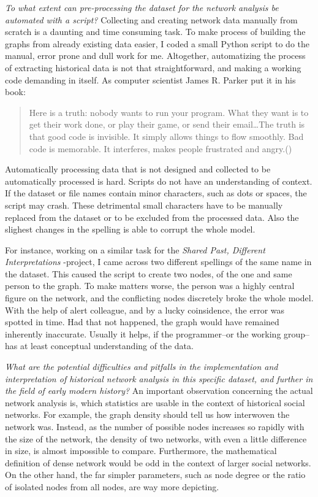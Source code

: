 \textit{To what extent can pre-processing the dataset for the network analysis be automated with a script?} Collecting and creating network data manually from scratch is a daunting and time consuming task. To make process of building the graphs from already existing data easier, I coded a small Python script to do the manual, error prone and dull work for me. Altogether, automatizing the process of extracting historical data is not that straightforward, and making a working code demanding in itself. As computer scientist James R. Parker put it in his book: 

\begin{quote}
	Here is a truth: nobody wants to run your program. What they want is to get their work done, or play their game, or send their email\ldots The truth is that good code is invisible. It simply allows things to flow smoothly. Bad code is memorable. It interferes, makes people frustrated and angry.(\cite[prefix p. XVI]{python})
\end{quote}

Automatically processing data that is not designed and collected to be automatically processed is hard. Scripts do not have an understanding of context. If the dataset or file names contain minor characters, such as dots or spaces, the script may crash. These detrimental small characters have to be manually replaced from the dataset or to be excluded from the processed data. Also the slighest changes in the spelling is able to corrupt the whole model.

For instance, working on a similar task for the \textit{Shared Past, Different Interpretations} -project, I came across two different spellings of the same name in the dataset. This caused the script to create two nodes, of the one and same person to the graph. To make matters worse, the person was a highly central figure on the network, and the conflicting nodes discretely broke the whole model. With the help of alert colleague, and by a lucky coinsidence, the error was spotted in time. Had that not happened, the graph would have remained inherently inaccurate. Usually it helps, if the programmer–or the working group–has at least conceptual understanding of the data. 

\textit{What are the potential difficulties and pitfalls in the implementation and interpretation of historical network analysis in this specific dataset, and further in the field of early modern history?} An important observation concerning the actual network analysis is, which statistics are usable in the context of historical social networks. For example, the graph density should tell us how interwoven the network was. Instead, as the number of possible nodes increases so rapidly with the size of the network, the density of two networks, with even a little difference in size, is almost impossible to compare. Furthermore, the mathematical definition of dense network would be odd in the context of larger social networks. On the other hand, the far simpler parameters, such as node degree or the ratio of isolated nodes from all nodes, are way more depicting. 

